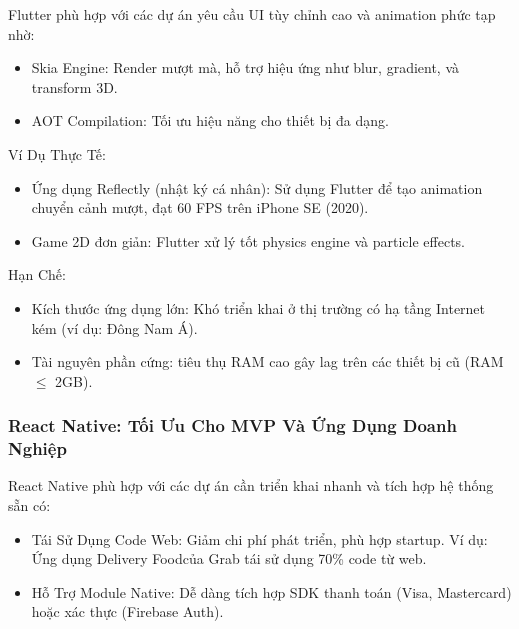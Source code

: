   \hspace*{0.8cm}Flutter phù hợp với các dự án yêu cầu UI tùy chỉnh cao và animation phức tạp nhờ:
  \setlength{\leftmargini}{1.5cm}
  \begin{itemize}
    \item Skia Engine: Render mượt mà, hỗ trợ hiệu ứng như blur, gradient, và transform 3D.
    \item AOT Compilation: Tối ưu hiệu năng cho thiết bị đa dạng.
  \end{itemize}
\vspace{0.5em}


  \hspace*{0.8cm}Ví Dụ Thực Tế:
  \setlength{\leftmargini}{1.5cm}
  \begin{itemize}
      \item Ứng dụng Reflectly (nhật ký cá nhân): Sử dụng Flutter để tạo animation chuyển cảnh mượt, đạt 60 FPS trên iPhone SE (2020).
      \item Game 2D đơn giản: Flutter xử lý tốt physics engine và particle effects.
  \end{itemize}
\vspace{0.5em}


  \hspace*{0.8cm}Hạn Chế:
  \setlength{\leftmargini}{1.5cm}
  \begin{itemize}
      \item Kích thước ứng dụng lớn: Khó triển khai ở thị trường có hạ tầng Internet kém (ví dụ: Đông Nam Á).
      \item Tài nguyên phần cứng: tiêu thụ RAM cao gây lag trên các thiết bị cũ (RAM $\leq$ 2GB).
  \end{itemize}
\vspace{0.5em}

\subsubsection{React Native: Tối Ưu Cho MVP Và Ứng Dụng Doanh Nghiệp}
    
      \hspace*{0.8cm}React Native phù hợp với các dự án cần triển khai nhanh và tích hợp hệ thống sẵn có:
      \setlength{\leftmargini}{1.5cm}
      \begin{itemize}
        \item Tái Sử Dụng Code Web: Giảm chi phí phát triển, phù hợp startup. Ví dụ: Ứng dụng Delivery Foodcủa Grab tái sử dụng 70\% code từ web.
        \item Hỗ Trợ Module Native: Dễ dàng tích hợp SDK thanh toán (Visa, Mastercard) hoặc xác thực (Firebase Auth).
      \end{itemize}
    \vspace{0.5em}

